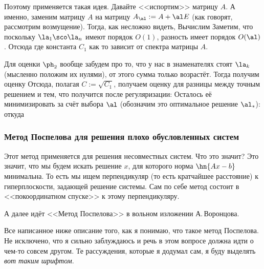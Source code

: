 \documentclass[a4paper]{article}
\begin{document}
Поэтому применяется такая идея. Давайте <<испортим>> матрицу $A$. А
именно, заменим матрицу $A$ на матрицу $A_\al := A + \al E$ (как
говорят, рассмотрим возмущение).  Тогда, как несложно видеть,
Вычислим   Заметим, что поскольку $\la_1\sco \la_n$ имеют
порядок $O(1)$, разность  имеет порядок $O(\al)$. Отсюда
 где константа $C_1$ как то зависит от
спектра матрицы $A$.

Для оценки $\ph_2$ вообще забудем про то, что у нас в знаменателях
стоят $\la_k$ (мысленно положим их нулями), от этого сумма только
возрастёт.  Тогда получим оценку   Отсюда, полагая $C := \sqrt{C_1}$, получаем оценку
для разницы между точным решением и тем, что получится после
регуляризации:   Осталось её минимизировать за счёт
выбора $\al$ (обозначим это оптимальное решение $\al_*$):  откуда 

\subsubsection{Метод Поспелова для решения плохо обусловленных систем}

Этот метод применяется для решения несовместных систем. Что это
значит? Это значит, что мы будем искать решение $x$, для которого
норма $\hn{Ax-b}$ минимальна. То есть мы ищем перпендикуляр (то есть
кратчайшее расстояние) к гиперплоскости, задающей решение системы.
Сам по себе метод состоит в <<покоординатном спуске>> к этому
перпендикуляру.

\begin{petit}
А далее идёт <<Метод Поспелова>> в вольном изложении А.\,Воронцова.

\medskip

Все написанное ниже описание того, как я понимаю, что такое метод
Поспелова. Не исключено, что я сильно заблуждаюсь и речь в этом
вопросе должна идти о чем-то совсем другом. Те рассуждения, которые я
додумал сам, я буду выделять \textsl{вот таким шрифтом}.

\end{petit}
\end{document}
